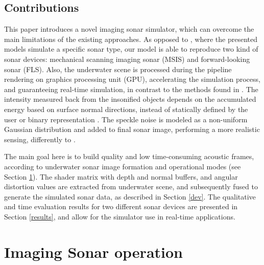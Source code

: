 \documentclass[final,5p,times]{elsarticle}
\begin{document}
\subsection{Contributions}

This paper introduces a novel imaging sonar simulator, which can overcome 
the main limitations of the existing approaches. As opposed to \cite{bell1997,coiras2009,gueriot2010,sac2015,demarco2015,gu2013,kwak2015}, where 
the presented models simulate a specific sonar type, our model is able to 
reproduce two kind of sonar devices: mechanical scanning imaging sonar (MSIS) and forward-looking sonar (FLS). Also, the underwater scene is processed during the pipeline rendering on graphics processing unit (GPU), accelerating the simulation process, and guaranteeing  real-time simulation, in contrast to the methods found in \cite{bell1997,coiras2009,sac2015,demarco2015}. The intensity measured back from the insonified objects depends on the accumulated energy based on surface normal directions, instead of statically defined by the user \cite{demarco2015} or binary representation \cite{gu2013, kwak2015}. The speckle noise is modeled as a non-uniform Gaussian distribution and added to final sonar image, performing a more realistic sensing, differently to \cite{gueriot2010,sac2015,gu2013,kwak2015}.

The main goal here is to build quality and low time-consuming acoustic frames, according to underwater sonar image formation and operational modes (see Section \ref{sonar:operation}). The shader matrix with depth and normal buffers, and angular distortion values are extracted from underwater scene, and subsequently fused to generate the simulated sonar data, as described in Section \ref{dev}. The qualitative and time evaluation results for two different sonar devices are presented in Section \ref{results}, and allow for the simulator use in real-time applications.


\section{Imaging Sonar operation}
\label{sonar:operation}
\end{document}
